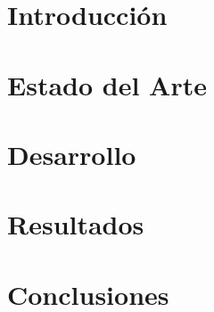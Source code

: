\documentclass[11pt]{report} %
\begin{document}
\tableofcontents
\newpage

\onehalfspacing%

\chapter{Introducción} %

\chapter{Estado del Arte} %

\chapter{Desarrollo} %

\chapter{Resultados} %

\chapter{Conclusiones} %

\end{document}
